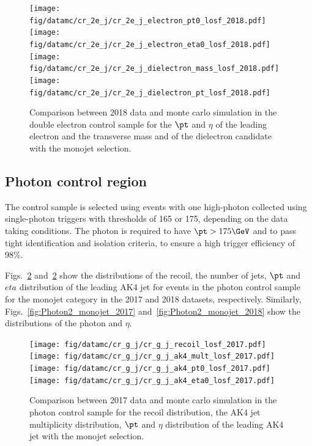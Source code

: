 {\begin{figure}[htbp]
    \begin{center}
        \texttt{[image: fig/datamc/cr\_2e\_j/cr\_2e\_j\_electron\_pt0\_losf\_2018.pdf]}
        \texttt{[image: fig/datamc/cr\_2e\_j/cr\_2e\_j\_electron\_eta0\_losf\_2018.pdf]} \\
        \texttt{[image: fig/datamc/cr\_2e\_j/cr\_2e\_j\_dielectron\_mass\_losf\_2018.pdf]}
        \texttt{[image: fig/datamc/cr\_2e\_j/cr\_2e\_j\_dielectron\_pt\_losf\_2018.pdf]}
    \end{center}
    \caption{Comparison between 2018 data and monte carlo simulation in the double electron control sample for
        the $\pt$ and $\eta$ of the leading electron and the transverse mass and \pt of the dielectron candidate with the monojet selection.}
    \label{fig:DE2_monojet_2018}
\end{figure}

\newpage

\subsection{Photon control region}
\label{sec:selection_cr_g}

The \phojets control sample is selected using events with one high-\pt photon collected using single-photon triggers with \pt thresholds of 165 or 175\GeV, depending
on the data taking conditions. The photon is required to have $\pt > 175\GeV$ and to pass tight identification and isolation criteria, to ensure a high trigger efficiency of 98\%. 

Figs.~\ref{fig:Photon_monojet_2017} and~\ref{fig:Photon_monojet_2017} show the distributions of the recoil, the number of jets, $\pt$ and $eta$ distribution of the leading AK4 jet for events in the photon control sample for the monojet category in the 2017 and 2018 datasets, respectively. Similarly, Figs.~\ref{fig:Photon2_monojet_2017} and~\ref{fig:Photon2_monojet_2018} show the distributions of the photon \pt and $\eta$.

\begin{figure}[htbp]
    \begin{center}
        \texttt{[image: fig/datamc/cr\_g\_j/cr\_g\_j\_recoil\_losf\_2017.pdf]}
        \texttt{[image: fig/datamc/cr\_g\_j/cr\_g\_j\_ak4\_mult\_losf\_2017.pdf]} \\
        \texttt{[image: fig/datamc/cr\_g\_j/cr\_g\_j\_ak4\_pt0\_losf\_2017.pdf]}
        \texttt{[image: fig/datamc/cr\_g\_j/cr\_g\_j\_ak4\_eta0\_losf\_2017.pdf]}
    \end{center}
    \caption{Comparison between 2017 data and monte carlo simulation in the photon  control sample for
        the recoil distribution, the AK4 jet multiplicity distribution,  $\pt$ and $\eta$ distribution
        of the leading AK4  jet with the monojet selection.}
    \label{fig:Photon_monojet_2017}
\end{figure}

}
